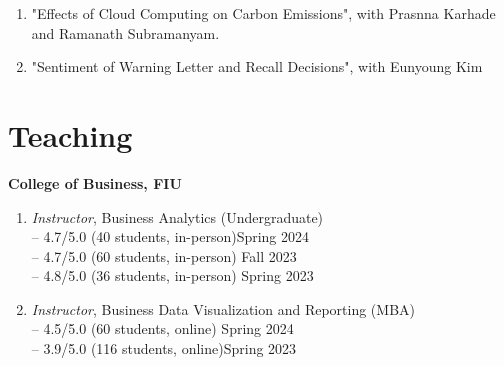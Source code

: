 \documentclass[margin,line]{resume}
\begin{document}
\begin{resume}
\begin{enumerate}[topsep=0pt, leftmargin=*]
         
       \item "Effects of Cloud Computing on Carbon Emissions", with Prasnna Karhade and Ramanath Subramanyam. 
       \item "Sentiment of Warning Letter
and Recall Decisions", with Eunyoung Kim


	  \end{enumerate}
	  

	  
 	  \section{\mysidestyle Teaching} 
 	  \textbf{College of Business, FIU}
 	    \begin{enumerate}[topsep=1pt, leftmargin=*]
         \item {\sl Instructor}, Business Analytics (Undergraduate)\\
         -- 4.7/5.0 (40 students, in-person)\hfill Spring 2024\\
         -- 4.7/5.0 (60 students, in-person) \hfill Fall 2023\\
         -- 4.8/5.0 (36 students, in-person) \hfill Spring 2023
         \item {\sl Instructor}, Business Data Visualization and Reporting (MBA)\\
         -- 4.5/5.0 (60 students, online) \hfill Spring 2024\\
         -- 3.9/5.0 (116 students, online)\hfill Spring 2023
         \end{enumerate}
 	  

\end{resume}
\end{document}
